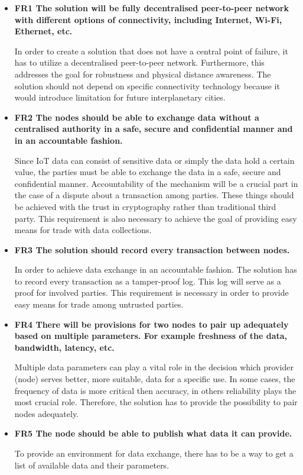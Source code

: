 \begin{itemize}
\item \textbf{FR1 The solution will be fully decentralised peer-to-peer network with different options of connectivity, including Internet, Wi-Fi, Ethernet, etc.}
\label{FR1}

\quad In order to create a solution that does not have a central point of failure, it has to utilize a decentralised peer-to-peer network. Furthermore, this addresses the goal for robustness and physical distance awareness. The solution should not depend on specific connectivity technology because it would introduce limitation for future interplanetary cities. 

\item \textbf{FR2 The nodes should be able to exchange data without a centralised authority in a safe, secure and confidential manner and in an accountable fashion.}
\label{FR2}

\quad Since IoT data can consist of sensitive data or simply the data hold a certain value, the parties must be able to exchange the data in a safe, secure and confidential manner. Accountability of the mechanism will be a crucial part in the case of a dispute about a transaction among parties. These things should be achieved with the trust in cryptography rather than traditional third party. This requirement is also necessary to achieve the goal of providing easy means for trade with data collections.

\item \textbf{FR3 The solution should record every transaction between nodes.}
\label{FR3}

\quad In order to achieve data exchange in an accountable fashion. The solution has to record every transaction as a tamper-proof log. This log will serve as a proof for involved parties. This requirement is necessary in order to provide easy means for trade among untrusted parties.

\item \textbf{FR4 There will be provisions for two nodes to pair up adequately based on multiple parameters. For example freshness of the data, bandwidth, latency, etc.}
\label{FR4}

\quad Multiple data parameters can play a vital role in the decision which provider (node) serves better, more suitable, data for a specific use. In some cases, the frequency of data is more critical then accuracy, in others reliability plays the most crucial role. Therefore, the solution has to provide the possibility to pair nodes adequately.

\item \textbf{FR5 The node should be able to publish what data it can provide.}
\label{FR5}

\quad To provide an environment for data exchange, there has to be a way to get a list of available data and their parameters.

\end{itemize}

